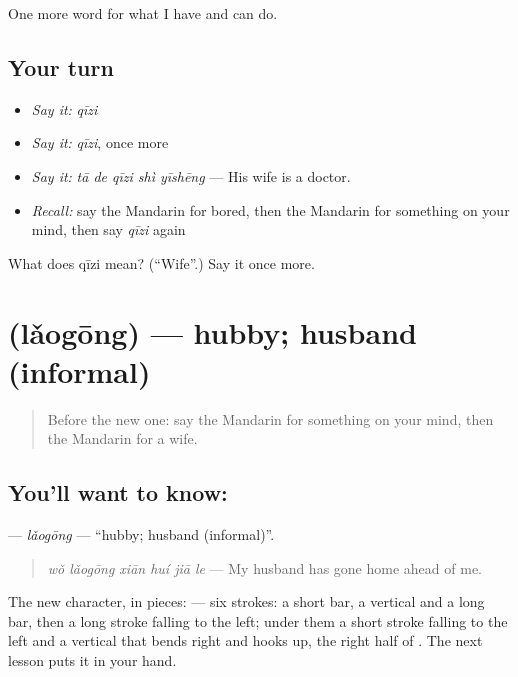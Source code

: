 \begin{grammarlens}[title={What you've built}]
One more word for what I have and can do.
\end{grammarlens}

\subsection*{Your turn}
\begin{itemize}
\raggedright
  \item \emph{Say it:} \emph{qīzi}
  \item \emph{Say it:} \emph{qīzi}, once more
  \item \emph{Say it:} \emph{tā de qīzi shì yīshēng} — His wife is a doctor.
  \item \emph{Recall:} say the Mandarin for bored, then the Mandarin for something on your mind, then say \emph{qīzi} again
\end{itemize}

\begin{tcolorbox}[breakable,colback=teal!4,colframe=teal!35!black,title={Before you move on}]
What does qīzi mean? (\textquotedblleft{}Wife\textquotedblright{}.) Say it once more.
\end{tcolorbox}
\section[\texorpdfstring{\zh{老公} (lǎogōng)}{老公 (lǎogōng)}]{ (lǎogōng) — hubby; husband (informal)}

\label{lesson:ZH-C272-laogong}



\begin{quote}
Before the new one: say the Mandarin for something on your mind, then the Mandarin for a wife.
\end{quote}

\subsection*{You'll want to know: }
\textbf{} — \emph{lǎogōng} — \textquotedblleft{}hubby; husband (informal)\textquotedblright{}.

\begin{quote}
\textbf{} \emph{wǒ lǎogōng xiān huí jiā le} — My husband has gone home ahead of me.
\end{quote}

The new character, in pieces:  — six strokes: a short bar, a vertical and a long bar, then a long stroke falling to the left; under them a short stroke falling to the left and a vertical that bends right and hooks up, the right half of . The next lesson puts it in your hand.

